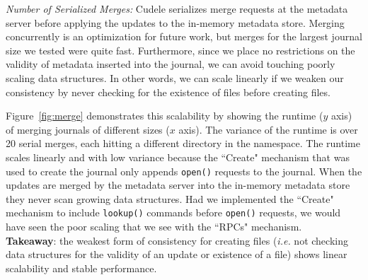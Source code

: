 
{\it Number of Serialized Merges:} Cudele serializes merge requests at the
metadata server before applying the updates to the in-memory metadata store.
Merging concurrently is an optimization for future work, but merges for the
largest journal size we tested were quite fast.  Furthermore, since we place no
restrictions on the validity of metadata inserted into the journal, we can
avoid touching poorly scaling data structures. In other words, we can scale
linearly if we weaken our consistency by never checking for the existence of
files before creating files.

Figure~\ref{fig:merge} demonstrates this scalability by showing the runtime
(\(y\) axis) of merging journals of different sizes (\(x\) axis). The variance
of the runtime is over 20 serial merges, each hitting a different directory in
the namespace.  The runtime scales linearly and with low variance because the
``Create" mechanism that was used to create the journal only appends
\texttt{open()} requests to the journal. When the updates are merged by the
metadata server into the in-memory metadata store they never scan growing data
structures. Had we implemented the ``Create" mechanism to include
\texttt{lookup()} commands before \texttt{open()} requests, we would have seen
the poor scaling that we see with the ``RPCs" mechanism.\\

\noindent\textbf{Takeaway}: the weakest form of consistency for creating files
({\it i.e.} not checking data structures for the validity of an update or
existence of a file) shows linear scalability and stable performance.



